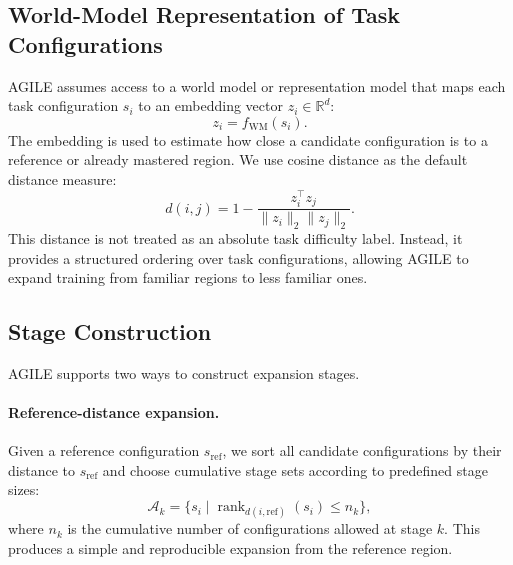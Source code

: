 \subsection{World-Model Representation of Task Configurations}
\label{subsec:world_model_representation}

AGILE assumes access to a world model or representation model that maps each
task configuration $s_i$ to an embedding vector $z_i \in \mathbb{R}^d$:
\begin{equation}
    z_i = f_{\mathrm{WM}}(s_i).
\end{equation}
The embedding is used to estimate how close a candidate configuration is to a
reference or already mastered region. We use cosine distance as the default
distance measure:
\begin{equation}
    d(i,j) = 1 - \frac{z_i^\top z_j}{\|z_i\|_2 \|z_j\|_2}.
\end{equation}
This distance is not treated as an absolute task difficulty label. Instead, it
provides a structured ordering over task configurations, allowing AGILE to
expand training from familiar regions to less familiar ones.

\subsection{Stage Construction}
\label{subsec:stage_construction}

AGILE supports two ways to construct expansion stages.

\paragraph{Reference-distance expansion.}
Given a reference configuration $s_{\mathrm{ref}}$, we sort all candidate
configurations by their distance to $s_{\mathrm{ref}}$ and choose cumulative
stage sets according to predefined stage sizes:
\begin{equation}
    \mathcal{A}_k =
    \{s_i \mid \operatorname{rank}_{d(i,\mathrm{ref})}(s_i) \leq n_k\},
\end{equation}
where $n_k$ is the cumulative number of configurations allowed at stage $k$.
This produces a simple and reproducible expansion from the reference region.

